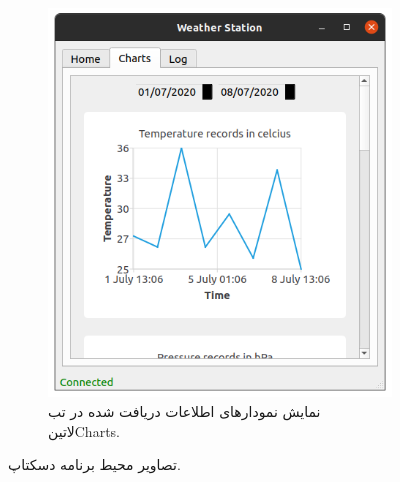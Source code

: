 \begin{figure}[!h]
\begin{subfigure}[b]{0.5\textwidth}
		\includegraphics[width=\linewidth]{Assets/desktopAppCharts.png}
		\caption{نمایش نمودار‌های اطلاعات دریافت شده در تب ‌لاتین{Charts}.}
		\label{fig:desktopAppCharts}
	\end{subfigure}
	\caption{تصاویر محیط برنامه دسکتاپ.}
	\label{fig:desktopApp}
\end{figure}


